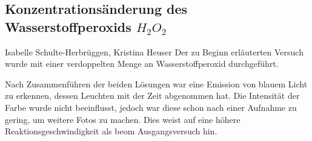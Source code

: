 \subsection{Konzentrationsänderung des Wasserstoffperoxids $H_{2}O_{2}$}
Isabelle Schulte-Herbrüggen, Kristina Heuser
Der zu Beginn erläuterten Versuch wurde mit einer verdoppelten Menge an Wasserstoffperoxid durchgeführt.

Nach Zusammenführen der beiden Lösungen war eine Emission von blauem Licht zu erkennen, dessen Leuchten mit der Zeit abgenommen hat. Die Intensität der Farbe wurde nicht beeinflusst, jedoch war diese schon nach einer Aufnahme zu gering, um weitere Fotos zu machen. Dies weist auf eine höhere Reaktionsgeschwindigkeit als beom Ausgangsversuch hin. 